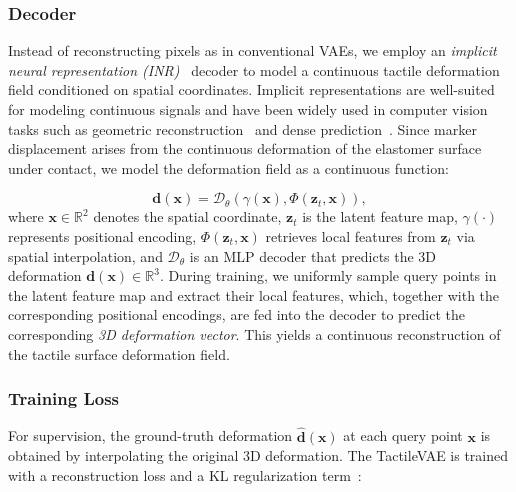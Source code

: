 \subsubsection{Decoder}

Instead of reconstructing pixels as in conventional VAEs, we employ an \textit{implicit neural representation (INR)}~\cite{sitzmann2020implicit} decoder to model a continuous tactile deformation field conditioned on spatial coordinates. Implicit representations are well-suited for modeling continuous signals and have been widely used in computer vision tasks such as geometric reconstruction~\cite{zhong20233d, park2019deepsdf} and dense prediction~\cite{chen2023dpf, yu2026infinidepth}. Since marker displacement arises from the continuous deformation of the elastomer surface under contact, we model the deformation field as a continuous function:

\begin{equation}
    \mathbf{d}(\mathbf{x}) = \mathcal{D}_{\theta} \left( \gamma(\mathbf{x}), \Phi(\mathbf{z}_{t}, \mathbf{x}) \right),
\end{equation}
where $\mathbf{x} \in \mathbb{R}^2$ denotes the spatial coordinate, $\mathbf{z}_{t}$ is the latent feature map, $\gamma(\cdot)$ represents positional encoding, $\Phi(\mathbf{z}_{t},\mathbf{x})$ retrieves local features from $\mathbf{z}_{t}$ via spatial interpolation, and $\mathcal{D}_{\theta}$ is an MLP decoder that predicts the 3D deformation $\mathbf{d}(\mathbf{x}) \in \mathbb{R}^3$. 
During training, we uniformly sample query points in the latent feature map and extract their local features, which, together with the corresponding positional encodings, are fed into the decoder to predict the corresponding \textit{3D deformation vector}. This yields a continuous reconstruction of the tactile surface deformation field.

\subsubsection{Training Loss}
For supervision, the ground-truth deformation $\hat{\mathbf{d}}(\mathbf{x})$ at each query point $\mathbf{x}$ is obtained by interpolating the original 3D deformation. 
The TactileVAE is trained with a reconstruction loss and a KL regularization term~\cite{kingma2013auto}:

